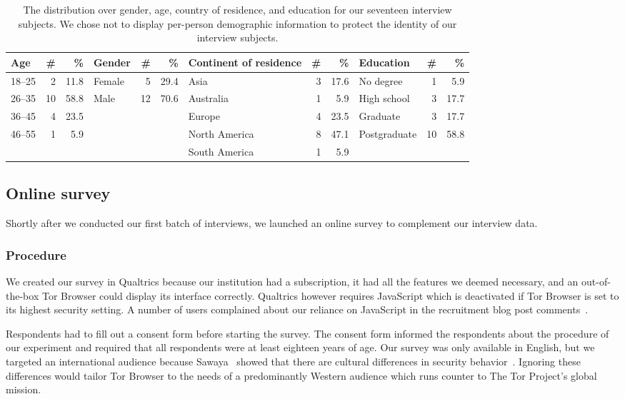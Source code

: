 \begin{table*}[ht]
	\centering
	\caption{The distribution over gender, age, country of residence, and
	education for our seventeen interview subjects.  We chose not to display
	per-person demographic information to protect the identity of our interview
	subjects.}
	\label{tab:interviewees}
	\begin{tabular}{l r r | l r r | l r r | l r r}
	\toprule
	Age & \# & \% &
	Gender & \# & \% &
	Continent of residence & \# & \% &
	Education & \# & \% \\
	\midrule
	18--25 & 2  & 11.8 & Female & 5  & 29.4 & Asia          & 3 & 17.6 & No degree    & 1  & 5.9 \\
	26--35 & 10 & 58.8 & Male   & 12 & 70.6 & Australia     & 1 &  5.9 & High school  & 3  & 17.7 \\
	36--45 & 4  & 23.5 &        &    &      & Europe        & 4 & 23.5 & Graduate     & 3  & 17.7 \\
	46--55 & 1  & 5.9  &        &    &      & North America & 8 & 47.1 & Postgraduate & 10 & 58.8 \\
	       &    &      &        &    &      & South America & 1 &  5.9 & & & \\
	\bottomrule
	\end{tabular}
\end{table*}

\subsection{Online survey}
\label{sec:online-survey}

Shortly after we conducted our first batch of interviews, we launched an online
survey to complement our interview data.

\subsubsection{Procedure}

We created our survey in Qualtrics because our institution had a subscription,
it had all the features we deemed necessary, and an out-of-the-box Tor Browser
could display its interface correctly.  Qualtrics however requires JavaScript
which is deactivated if Tor Browser is set to its highest security setting.  A
number of users complained about our reliance on JavaScript in the recruitment
blog post comments~\cite{Winter2017a}.

Respondents had to fill out a consent form before starting the survey. The
consent form informed the respondents about the procedure of our experiment and
required that all respondents were at least eighteen years of age.  Our survey
was only available in English, but we targeted an international audience because
Sawaya \ea\ showed that there are cultural differences in security
behavior~\cite{Sawaya2017a}.  Ignoring these differences would tailor Tor
Browser to the needs of a predominantly Western audience which runs counter to
The Tor Project's global mission.

